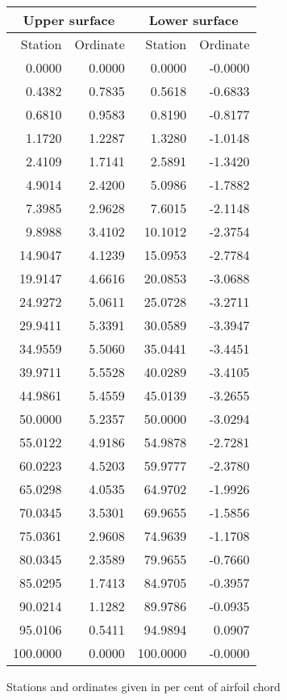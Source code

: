 \documentclass[11pt]{book}
\begin{document}
 \hspace{4mm}
 \begin{tabular}{|r|r|r|r|} \hline 
 \multicolumn{2}{|c|}{Upper surface} & \multicolumn{2}{|c|}{Lower surface} \\
 \hline
 Station & Ordinate & Station & Ordinate \\
 \hline
0.0000 & 0.0000 & 0.0000 & -0.0000 \\
0.4382 & 0.7835 & 0.5618 & -0.6833 \\
0.6810 & 0.9583 & 0.8190 & -0.8177 \\
1.1720 & 1.2287 & 1.3280 & -1.0148 \\
2.4109 & 1.7141 & 2.5891 & -1.3420 \\
4.9014 & 2.4200 & 5.0986 & -1.7882 \\
7.3985 & 2.9628 & 7.6015 & -2.1148 \\
9.8988 & 3.4102 & 10.1012 & -2.3754 \\
14.9047 & 4.1239 & 15.0953 & -2.7784 \\
19.9147 & 4.6616 & 20.0853 & -3.0688 \\
24.9272 & 5.0611 & 25.0728 & -3.2711 \\
29.9411 & 5.3391 & 30.0589 & -3.3947 \\
34.9559 & 5.5060 & 35.0441 & -3.4451 \\
39.9711 & 5.5528 & 40.0289 & -3.4105 \\
44.9861 & 5.4559 & 45.0139 & -3.2655 \\
50.0000 & 5.2357 & 50.0000 & -3.0294 \\
55.0122 & 4.9186 & 54.9878 & -2.7281 \\
60.0223 & 4.5203 & 59.9777 & -2.3780 \\
65.0298 & 4.0535 & 64.9702 & -1.9926 \\
70.0345 & 3.5301 & 69.9655 & -1.5856 \\
75.0361 & 2.9608 & 74.9639 & -1.1708 \\
80.0345 & 2.3589 & 79.9655 & -0.7660 \\
85.0295 & 1.7413 & 84.9705 & -0.3957 \\
90.0214 & 1.1282 & 89.9786 & -0.0935 \\
95.0106 & 0.5411 & 94.9894 & 0.0907 \\
100.0000 & 0.0000 & 100.0000 & -0.0000 \\
 \hline 
 \end{tabular}
 \vspace{8mm}

Stations and ordinates given in per cent of airfoil chord
\end{document}
